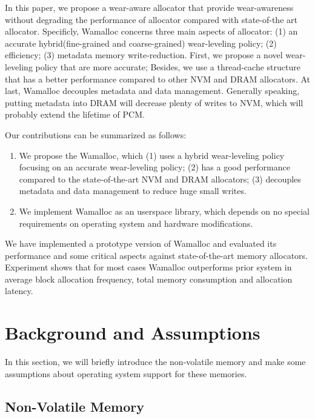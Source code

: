 \documentclass[10pt, conference, compsocconf]{IEEEtran}
\begin{document}
In this paper, we propose a wear-aware allocator that provide wear-awareness without degrading the performance of allocator compared with state-of-the art allocator. 
Specificly, Wamalloc concerns three main aspects of allocator:
(1) an accurate hybrid(fine-grained and coarse-grained) wear-leveling policy;
(2) efficiency;
(3) metadata memory write-reduction.
First, we propose a novel wear-leveling policy that are more accurate;
Besides, we use a thread-cache structure that has a better performance compared to other NVM and DRAM allocators.
At last, Wamalloc decouples metadata and data management.
Generally speaking, putting metadata into DRAM will decrease plenty of writes to NVM, which will probably extend the lifetime of PCM.

Our contributions can be summarized as follows:
\begin{enumerate}
    \item We propose the Wamalloc, which
        (1) uses a hybrid wear-leveling policy focusing on an accurate wear-leveling policy;
        (2) has a good performance compared to the state-of-the-art NVM and DRAM allocators;
        (3) decouples metadata and data management to reduce huge small writes.
    \item We implement Wamalloc as an userspace library, which depends on no special requirements on operating system and hardware modifications.
\end{enumerate}

We have implemented a prototype version of Wamalloc and evaluated its performance and some critical aspects against state-of-the-art memory allocators.
Experiment shows that for most cases Wamalloc outperforms prior system in average block allocation frequency, total memory consumption and allocation latency.


\section{Background and Assumptions}

In this section, we will briefly introduce the non-volatile memory and
make some assumptions about operating system support for these memories.

\subsection{Non-Volatile Memory}
\end{document}
